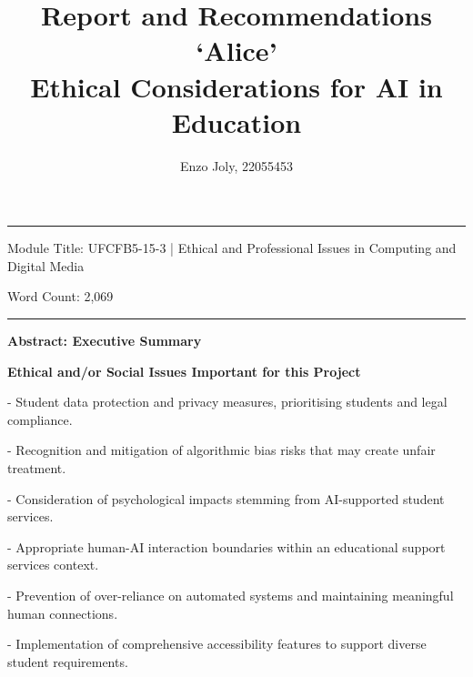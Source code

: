 \documentclass[14pt,a4paper]{article}
\title{Report and Recommendations\\ `Alice' \\ Ethical Considerations for AI in Education}
\author{Enzo Joly, 22055453}
\date{}
\begin{document}
\maketitle

\hrule

\vspace{3em}

Module Title: UFCFB5-15-3 | Ethical and Professional Issues in Computing and Digital Media

Word Count: 2,069

\vspace{3em}
\hrule

\vspace{2em}
\textbf{\Large{Abstract: Executive Summary}}

\begin{center}
\textbf{Ethical and/or Social Issues Important for this Project}
\end{center}


- Student data protection and privacy measures, prioritising students and legal compliance.

- Recognition and mitigation of algorithmic bias risks that may create unfair treatment.

- Consideration of psychological impacts stemming from AI-supported student services.

- Appropriate human-AI interaction boundaries within an educational support services context.

- Prevention of over-reliance on automated systems and maintaining meaningful human connections.

- Implementation of comprehensive accessibility features to support diverse student requirements.
\end{document}
